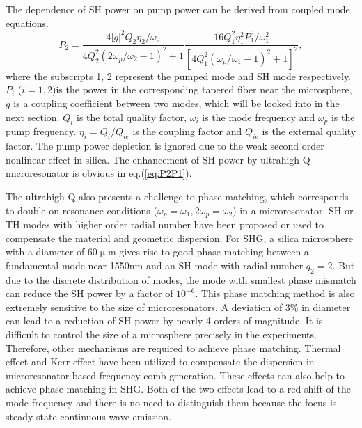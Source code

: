 \documentclass[a4paper,8pt,hyperref, twocolumn]{article}
\begin{document}



The dependence of SH power on pump power can be derived from coupled mode equations\cite{haus1991coupled}.
\begin{equation}
P_2 = \frac{4|g|^2Q_2\eta_2/\omega_2}{4Q_2^2(2\omega_p/\omega_2-1)^2+1}\frac{16Q_1^2\eta_1^2P_1^2/\omega_1^2}{[4Q_1^2(\omega_p/\omega_1-1)^2+1]^2},
\label{eq:P2P1}
\end{equation}
where the subscripts 1, 2 represent the pumped mode and SH mode respectively. $P_i$ ($i=1, 2$)is the power in the corresponding tapered fiber near the microsphere, $g$ is a coupling coefficient between two modes, which will be looked into in the next section. $Q_i$ is the total quality factor, $\omega_i$ is the mode frequency and $\omega_p$ is the pump frequency. $\eta_{i}=Q_i/Q_{ie}$ is the coupling factor and $Q_{ie}$ is the external quality factor. The pump power depletion is ignored due to the weak second order nonlinear effect in silica. The enhancement of SH power by ultrahigh-Q microresonator is obvious in eq.(\ref{eq:P2P1}). 

The ultrahigh Q also presents a challenge to phase matching, which corresponds to double on-resonance conditions ($\omega_p = \omega_1, 2\omega_p = \omega_2$) in a microresonator\cite{carmon2007visible, kozyreff2008whispering, xu2008second, farnesi2014optical}. SH or TH modes with higher order radial number have been proposed or used to compensate the material and geometric dispersion\cite{carmon2007visible, kozyreff2008whispering, farnesi2014optical}. For SHG, a silica microsphere with a diameter of 60$\upmu$m gives rise to good phase-matching between a fundamental mode near 1550nm and an SH mode with radial number $q_2=2$. But due to the discrete distribution of modes, the mode with smallest phase mismatch can reduce the SH power by a factor of $10^{-6}$. This phase matching method is also extremely sensitive to the size of microresonators. A deviation of 3\% in diameter can lead to a reduction of SH power by nearly 4 orders of magnitude. It is difficult to control the size of a microsphere precisely in the experiments. Therefore, other mechanisms are required to achieve phase matching. Thermal effect and Kerr effect have been utilized to compensate the dispersion in microresonator-based frequency comb generation\cite{del2011octave, herr2014temporal}. These effects can also help to achieve phase matching in SHG. Both of the two effects lead to a red shift of the mode frequency \cite{ilchenko1992thermal, treussart1998evidence,  carmon2004dynamical, fomin2005nonstationary} and there is no need to distinguish them because the focus is steady state continuous wave emission. 
\end{document}
